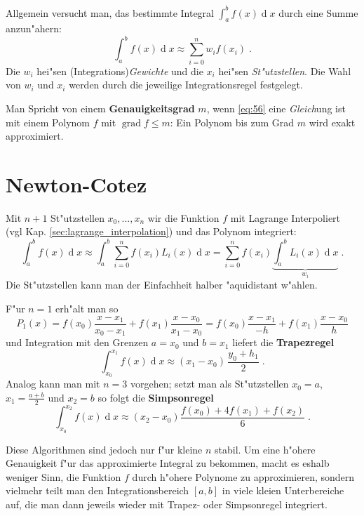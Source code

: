 \documentclass[a4paper]{book}
\newcommand{\abs}{\bigskip \noindent}
\newcommand{\diff}{\ensuremath{\operatorname d}}
\begin{document}
Allgemein versucht man, das bestimmte Integral $\int_a^b f(x) \diff x$
durch eine Summe anzun"ahern:
\begin{equation}
  \label{eq:56}
  \int_a^b f(x) \diff x \approx \sum_{i=0}^n w_i f(x_i) \;.
\end{equation}
Die $w_i$ hei"sen (Integrations)\emph{Gewichte} und die $x_i$ hei"sen
\emph{St"utzstellen}. Die Wahl von $w_i$ und $x_i$ werden durch die
jeweilige Integrationsregel festgelegt.

\abs
Man Spricht von einem \textbf{Genauigkeitsgrad } $m$, wenn \eqref{eq:56}
eine \emph{Gleich}ung ist mit einem Polynom $f$ mit
$\operatorname{grad} f \leq m$: Ein Polynom bis zum Grad $m$ wird
exakt approximiert.



\section{Newton-Cotez}
\label{sec:newton_cotez}


Mit $n+1$ St"utzstellen $x_0, ..., x_n$ wir die Funktion $f$ mit Lagrange Interpoliert
(vgl Kap. \ref{sec:lagrange_interpolation}) und das Polynom integriert:
\begin{equation}
  \label{eq:57}
  \int_a^b f(x) \diff x \approx 
\int_a^b \sum_{i=0}^n f(x_i) L_i(x) \diff x
=
 \sum_{i=0}^n f(x_i) \underbrace{\int_a^b L_i(x) \diff x}_{w_i} \;.
\end{equation}
Die St"utzstellen kann man der Einfachheit halber "aquidistant
w"ahlen.

F"ur $n=1$ erh"alt man so
\begin{equation*}
  P_1(x) = f(x_0)\frac{x-x_1}{x_0-x_1} + f(x_1)\frac{x-x_0}{x_1-x_0} = 
f(x_0)\frac{x-x_1}{-h} + f(x_1)\frac{x-x_0}{h}
\end{equation*}
und Integration mit den Grenzen $a = x_0$ und $b = x_1$ liefert die
\textbf{Trapezregel}
\begin{equation}
  \label{eq:58}
  \int_{x_0}^{x_1} f(x) \diff x  \approx (x_1-x_0) \, \frac{y_0 + h_1}{2} \;.
\end{equation}
Analog kann man mit $n=3$ vorgehen; setzt man als St"utzstellen $x_0 =
a$, $x_1 = \frac{a+b}{2}$ und $x_2 = b$ so folgt die
\textbf{Simpsonregel}
\begin{equation}
  \label{eq:59}
  \int_{x_0}^{x_2} f(x) \diff x \approx 
(x_2-x_0) \frac{f(x_0) + 4 f(x_1) + f(x_2)}{6} \;.
\end{equation}

\abs
Diese Algorithmen sind jedoch nur f"ur kleine $n$ stabil. Um eine
h"ohere Genauigkeit f"ur das approximierte Integral zu bekommen, macht
es eshalb weniger Sinn, die Funktion $f$ durch h"ohere Polynome zu
approximieren, sondern vielmehr teilt man den Integrationsbereich
$[a,b]$ in viele kleien Unterbereiche auf, die man dann jeweils wieder
mit Trapez- oder Simpsonregel integriert.
\end{document}

